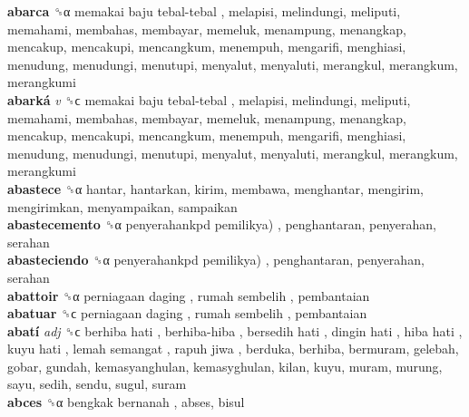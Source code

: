 \textbf{abarca} ␝α   memakai baju tebal-tebal , melapisi, melindungi, meliputi, memahami, membahas, membayar, memeluk, menampung, menangkap, mencakup, mencakupi, mencangkum, menempuh, mengarifi, menghiasi, menudung, menudungi, menutupi, menyalut, menyaluti, merangkul, merangkum, merangkumi  \\
\textbf{abarká} \emph{v}  ␝ϲ   memakai baju tebal-tebal , melapisi, melindungi, meliputi, memahami, membahas, membayar, memeluk, menampung, menangkap, mencakup, mencakupi, mencangkum, menempuh, mengarifi, menghiasi, menudung, menudungi, menutupi, menyalut, menyaluti, merangkul, merangkum, merangkumi  \\
\textbf{abastece} ␝α  hantar, hantarkan, kirim, membawa, menghantar, mengirim, mengirimkan, menyampaikan, sampaikan  \\
\textbf{abastecemento} ␝α   penyerahankpd pemilikya) , penghantaran, penyerahan, serahan  \\
\textbf{abasteciendo} ␝α   penyerahankpd pemilikya) , penghantaran, penyerahan, serahan  \\
\textbf{abattoir} ␝α   perniagaan daging ,  rumah sembelih , pembantaian  \\
\textbf{abatuar} ␝ϲ   perniagaan daging ,  rumah sembelih , pembantaian  \\
\textbf{abatí} \emph{adj}  ␝ϲ   berhiba hati ,  berhiba-hiba ,  bersedih hati ,  dingin hati ,  hiba hati ,  kuyu hati ,  lemah semangat ,  rapuh jiwa , berduka, berhiba, bermuram, gelebah, gobar, gundah, kemasyanghulan, kemasyghulan, kilan, kuyu, muram, murung, sayu, sedih, sendu, sugul, suram  \\
\textbf{abces} ␝α   bengkak bernanah , abses, bisul  \\
